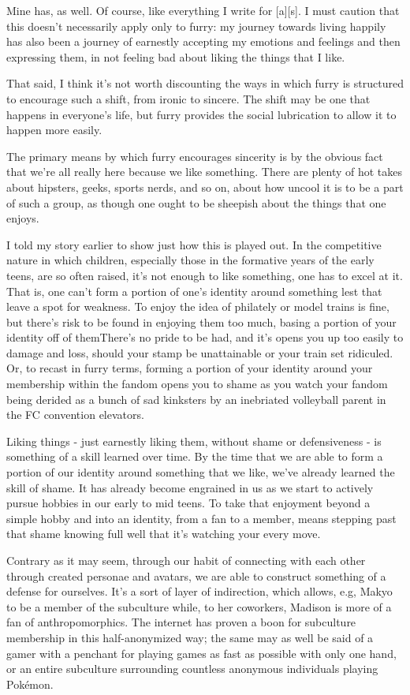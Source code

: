 Mine has, as well. Of course, like everything I write for {[}a{]}{[}s{]}. I must caution that this doesn't necessarily apply only to furry: my journey towards living happily has also been a journey of earnestly accepting my emotions and feelings and then expressing them, in not feeling bad about liking the things that I like.

That said, I think it's not worth discounting the ways in which furry is structured to encourage such a shift, from ironic to sincere. The shift may be one that happens in everyone's life, but furry provides the social lubrication to allow it to happen more easily.

The primary means by which furry encourages sincerity is by the obvious fact that we're all really here because we like something. There are plenty of hot takes about hipsters, geeks, sports nerds, and so on, about how uncool it is to be a part of such a group, as though one ought to be sheepish about the things that one enjoys.

I told my story earlier to show just how this is played out. In the competitive nature in which children, especially those in the formative years of the early teens, are so often raised, it's not enough to like something, one has to excel at it. That is, one can't form a portion of one's identity around something lest that leave a spot for weakness. To enjoy the idea of philately or model trains is fine, but there's risk to be found in enjoying them too much, basing a portion of your identity off of themThere's no pride to be had, and it's opens you up too easily to damage and loss, should your stamp be unattainable or your train set ridiculed. Or, to recast in furry terms, forming a portion of your identity around your membership within the fandom opens you to shame as you watch your fandom being derided as a bunch of sad kinksters by an inebriated volleyball parent in the FC convention elevators.

Liking things - just earnestly liking them, without shame or defensiveness - is something of a skill learned over time. By the time that we are able to form a portion of our identity around something that we like, we've already learned the skill of shame. It has already become engrained in us as we start to actively pursue hobbies in our early to mid teens. To take that enjoyment beyond a simple hobby and into an identity, from a fan to a member, means stepping past that shame knowing full well that it's watching your every move.

Contrary as it may seem, through our habit of connecting with each other through created personae and avatars, we are able to construct something of a defense for ourselves. It's a sort of layer of indirection, which allows, e.g, Makyo to be a member of the subculture while, to her coworkers, Madison is more of a fan of anthropomorphics. The internet has proven a boon for subculture membership in this half-anonymized way; the same may as well be said of a gamer with a penchant for playing games as fast as possible with only one hand, or an entire subculture surrounding countless anonymous individuals playing Pokémon.

